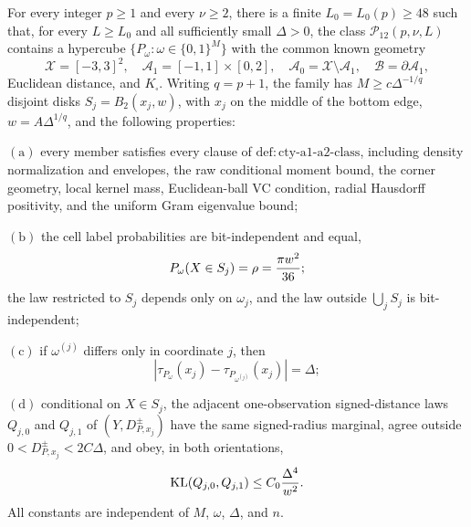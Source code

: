 For every integer \(p\geq1\) and every \(\nu\geq2\), there is a finite \(L_0=L_0(p)\geq48\) such that, for every \(L\geq L_0\) and all sufficiently small \(\Delta>0\), the class \(\mathcal P_{12}(p,\nu,L)\) contains a hypercube \(\{P_\omega:\omega\in\{0,1\}^M\}\) with the common known geometry
\[
 \mathcal X=[-3,3]^2,
 \quad \mathcal A_1=[-1,1]\times[0,2],
 \quad \mathcal A_0=\mathcal X\setminus\mathcal A_1,
 \quad \mathcal B=\partial\mathcal A_1,
\]
Euclidean distance, and \(K_\square\).  Writing \(q=p+1\), the family has \(M\geq c\Delta^{-1/q}\) disjoint disks \(S_j=B_2(x_j,w)\), with \(x_j\) on the middle of the bottom edge, \(w=A\Delta^{1/q}\), and the following properties:

\(\mathrm{(a)}\) every member satisfies every clause of \(\mathrm{def:cty\text{-}a1\text{-}a2\text{-}class}\), including density normalization and envelopes, the raw conditional moment bound, the corner geometry, local kernel mass, Euclidean-ball VC condition, radial Hausdorff positivity, and the uniform Gram eigenvalue bound;

\(\mathrm{(b)}\) the cell label probabilities are bit-independent and equal,
\[
 P_\omega(X\in S_j)=\rho={\pi w^2\over36};
\]
the law restricted to \(S_j\) depends only on \(\omega_j\), and the law outside \(\bigcup_jS_j\) is bit-independent;

\(\mathrm{(c)}\) if \(\omega^{(j)}\) differs only in coordinate \(j\), then
\[
 |\tau_{P_\omega}(x_j)-\tau_{P_{\omega^{(j)}}}(x_j)|=\Delta;
\]

\(\mathrm{(d)}\) conditional on \(X\in S_j\), the adjacent one-observation signed-distance laws \(Q_{j,0}\) and \(Q_{j,1}\) of \((Y,D^{\pm}_{P,x_j})\) have the same signed-radius marginal, agree outside \(0<D^{\pm}_{P,x_j}<2C\Delta\), and obey, in both orientations,
\[
 \operatorname{KL}(Q_{j,0},Q_{j,1})\leq C_0{\Delta^4\over w^2}.
\]
All constants are independent of \(M\), \(\omega\), \(\Delta\), and \(n\).